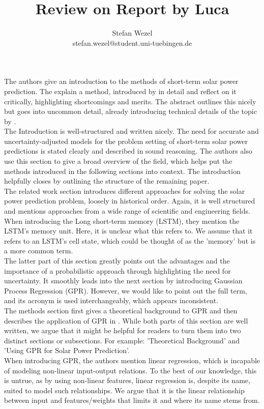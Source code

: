 \documentclass{article} %
\title{Review on Report by Luca \vspace{0.5cm}}
\author{Stefan Wezel \\ stefan.wezel@student.uni-tuebingen.de}
\def\figwidth{.5\linewidth}
\def\figheight{.15\textheight}
\begin{document}
\maketitle

The authors give an introduction to the methods of short-term solar power prediction. The explain a method, introduced by \citet{lawati2020short} in detail and reflect on it critically, highlighting shortcomings and merits. The abstract outlines this nicely but goes into uncommon detail, already introducing technical details of the topic by \citet{lawati2020short}.\\
The Introduction is well-structured and written nicely. The need for accurate and uncertainty-adjusted models for the problem setting of short-term solar power predictions is stated clearly and described in sound reasoning. The authors also use this section to give a broad overview of the field, which helps put the methods introduced in the following sections into context. The introduction helpfully closes by outlining the structure of the remaining paper.\\
The related work section introduces different approaches for solving the solar power prediction problem, loosely in historical order. Again, it is well structured and mentions approaches from a wide range of scientific and engineering fields. When introducing the Long short-term memory (LSTM), they mention the LSTM's memory unit. Here, it is unclear what this refers to. We assume that it refers to an LSTM's cell state, which could be thought of as the 'memory' but is a more common term.\\
The latter part of this section greatly points out the advantages and the importance of a probabilistic approach through highlighting the need for uncertainty. It smoothly leads into the next section by introducing Gaussian Process Regression (GPR). However, we would like to point out the full term, and its acronym is used interchangeably, which appears inconsistent.\\
The methods section first gives a theoretical background to GPR and then describes the application of GPR in \citet{lawati2020short}. While both parts of this section are well written, we argue that it might be helpful for readers to turn them into two distinct sections or subsections. For example: 'Theoretical Background' and 'Using GPR for Solar Power Prediction'.\\
When introducing GPR, the authors mention linear regression, which is incapable of modeling non-linear input-output relations. To the best of our knowledge, this is untrue, as by using non-linear features, linear regression is, despite its name, suited to model such relationships. We argue that it is the linear relationship between input and features/weights that limits it and where its name stems from.\\
\end{document}
